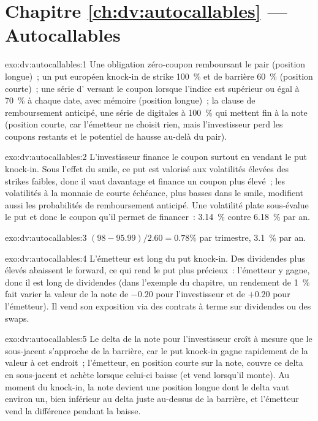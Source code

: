 \section*{Chapitre \ref{ch:dv:autocallables} --- Autocallables}

\begin{solution}{exo:dv:autocallables:1}
Une obligation zéro-coupon remboursant le pair (position longue)~; un put européen knock-in de strike 100~\% et de barrière 60~\% (position courte)~; une série d' versant le coupon lorsque l'indice est supérieur ou égal à 70~\% à chaque date, avec mémoire (position longue)~; la clause de remboursement anticipé, une
série de digitales à 100~\% qui mettent fin à la note (position courte, car l'émetteur ne choisit rien, mais l'investisseur perd les coupons restants
et le potentiel de hausse au-delà du pair).
\end{solution}

\begin{solution}{exo:dv:autocallables:2}
L'investisseur finance le coupon surtout en vendant le put knock-in. Sous l'effet du smile, ce put est valorisé aux volatilités élevées des
strikes faibles, donc il vaut davantage et finance un coupon plus élevé~; les volatilités à la monnaie de courte échéance, plus basses dans le smile, modifient aussi les
probabilités de remboursement anticipé. Une volatilité plate sous-évalue le put et donc le coupon qu'il permet de financer~: 3.14~\% contre 6.18~\% par an.
\end{solution}

\begin{solution}{exo:dv:autocallables:3}
$(98-95.99)/2.60=0.78\%$ par trimestre, 3.1~\% par an.
\end{solution}

\begin{solution}{exo:dv:autocallables:4}
L'émetteur est long du put knock-in. Des dividendes plus élevés abaissent le forward, ce qui rend le put plus précieux~: l'émetteur y gagne, donc il est
long de dividendes (dans l'exemple du chapitre, un rendement de 1~\% fait varier la valeur de la note de $-0.20$ pour l'investisseur et de $+0.20$ pour l'émetteur). Il vend
son exposition via des contrats à terme sur dividendes ou des swaps.
\end{solution}

\begin{solution}{exo:dv:autocallables:5}
Le delta de la note pour l'investisseur croît à mesure que le sous-jacent s'approche de la barrière, car le put knock-in gagne rapidement de la valeur à cet endroit~;
l'émetteur, en position courte sur la note, couvre ce delta en sous-jacent et achète lorsque celui-ci baisse (et vend lorsqu'il monte). Au moment du knock-in, la note
devient une position longue dont le delta vaut environ un, bien inférieur au delta juste au-dessus de la barrière, et l'émetteur vend la différence
pendant la baisse.
\end{solution}

